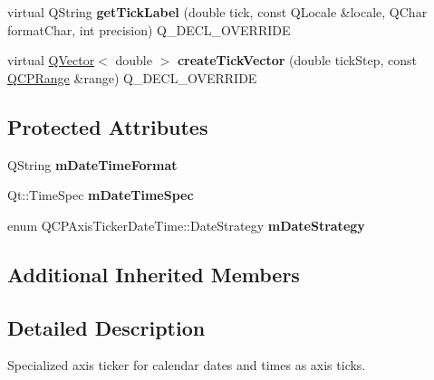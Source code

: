 \begin{DoxyCompactItemize}
\item 
virtual Q\+String {\bfseries get\+Tick\+Label} (double tick, const Q\+Locale \&locale, Q\+Char format\+Char, int precision) Q\+\_\+\+D\+E\+C\+L\+\_\+\+O\+V\+E\+R\+R\+I\+DE\hypertarget{class_q_c_p_axis_ticker_date_time_a8869afd045012689cd8a541af7e5178e}{}\label{class_q_c_p_axis_ticker_date_time_a8869afd045012689cd8a541af7e5178e}

\item 
virtual \hyperlink{class_q_vector}{Q\+Vector}$<$ double $>$ {\bfseries create\+Tick\+Vector} (double tick\+Step, const \hyperlink{class_q_c_p_range}{Q\+C\+P\+Range} \&range) Q\+\_\+\+D\+E\+C\+L\+\_\+\+O\+V\+E\+R\+R\+I\+DE\hypertarget{class_q_c_p_axis_ticker_date_time_a4dfccc4115da212812ef22e5662171d6}{}\label{class_q_c_p_axis_ticker_date_time_a4dfccc4115da212812ef22e5662171d6}

\end{DoxyCompactItemize}
\subsection*{Protected Attributes}
\begin{DoxyCompactItemize}
\item 
Q\+String {\bfseries m\+Date\+Time\+Format}\hypertarget{class_q_c_p_axis_ticker_date_time_adbbb25add598377998c0c57dbd29adaf}{}\label{class_q_c_p_axis_ticker_date_time_adbbb25add598377998c0c57dbd29adaf}

\item 
Qt\+::\+Time\+Spec {\bfseries m\+Date\+Time\+Spec}\hypertarget{class_q_c_p_axis_ticker_date_time_a5f5abe83c371f13eb3415585e638dba9}{}\label{class_q_c_p_axis_ticker_date_time_a5f5abe83c371f13eb3415585e638dba9}

\item 
enum Q\+C\+P\+Axis\+Ticker\+Date\+Time\+::\+Date\+Strategy {\bfseries m\+Date\+Strategy}\hypertarget{class_q_c_p_axis_ticker_date_time_a7be1477443d73fef8dd25a07d9fe4b20}{}\label{class_q_c_p_axis_ticker_date_time_a7be1477443d73fef8dd25a07d9fe4b20}

\end{DoxyCompactItemize}
\subsection*{Additional Inherited Members}


\subsection{Detailed Description}
Specialized axis ticker for calendar dates and times as axis ticks. 



